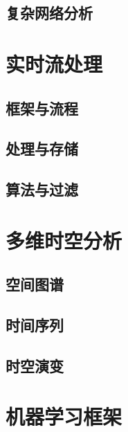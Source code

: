 \documentclass[letterpaper,10pt,english]{sphinxmanual}
\begin{document}
\subsection{复杂网络分析}
\label{gispark_network:_u590d_u6742_u7f51_u7edc_u5206_u6790}

\section{实时流处理}
\label{gispark_stream::doc}\label{gispark_stream:_u5b9e_u65f6_u6d41_u5904_u7406}

\subsection{框架与流程}
\label{gispark_stream:_u6846_u67b6_u4e0e_u6d41_u7a0b}

\subsection{处理与存储}
\label{gispark_stream:_u5904_u7406_u4e0e_u5b58_u50a8}

\subsection{算法与过滤}
\label{gispark_stream:_u7b97_u6cd5_u4e0e_u8fc7_u6ee4}

\section{多维时空分析}
\label{gispark_dimension:_u591a_u7ef4_u65f6_u7a7a_u5206_u6790}\label{gispark_dimension::doc}

\subsection{空间图谱}
\label{gispark_dimension:_u7a7a_u95f4_u56fe_u8c31}

\subsection{时间序列}
\label{gispark_dimension:_u65f6_u95f4_u5e8f_u5217}

\subsection{时空演变}
\label{gispark_dimension:_u65f6_u7a7a_u6f14_u53d8}

\section{机器学习框架}
\label{gispark_ml::doc}\label{gispark_ml:_u673a_u5668_u5b66_u4e60_u6846_u67b6}
\end{document}
